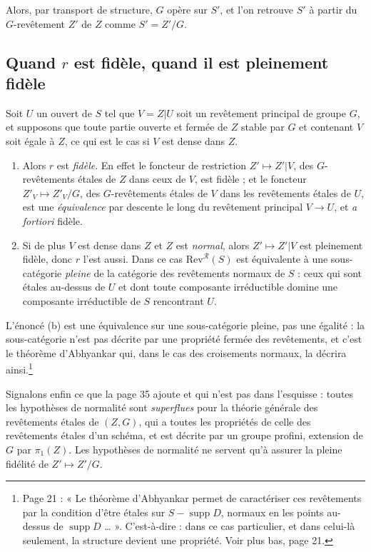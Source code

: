 \documentclass[11pt,a4paper]{article}
\begin{document}
Alors, par transport de structure, $G$ opère sur $S'$, et l'on retrouve $S'$ à
partir du $G$-revêtement $Z'$ de $Z$ comme $S' = Z'/G$.

\subsection*{Quand $r$ est fidèle, quand il est pleinement fidèle}

Soit $U$ un ouvert de $S$ tel que $V = Z|U$ soit un revêtement principal de
groupe $G$, et supposons que toute partie ouverte et fermée de $Z$ stable par
$G$ et contenant $V$ soit égale à $Z$, ce qui est le cas si $V$ est dense dans
$Z$.

\begin{enumerate}
  \item[(a)] Alors $r$ est \emph{fidèle}. En effet le foncteur de restriction
    $Z' \mapsto Z'|V$, des $G$-revêtements étales de $Z$ dans ceux de $V$, est
    fidèle ; et le foncteur $Z'_{V} \mapsto Z'_{V}/G$, des $G$-revêtements
    étales de $V$ dans les revêtements étales de $U$, est une
    \emph{équivalence} par descente le long du revêtement principal
    $V \to U$, et \emph{a fortiori} fidèle.
  \item[(b)] Si de plus $V$ est dense dans $Z$ et $Z$ est \emph{normal}, alors
    $Z' \mapsto Z'|V$ est pleinement fidèle, donc $r$ l'est aussi. Dans ce cas
    $\mathrm{Rev}^{\mathcal{R}}(S)$ est équivalente à une sous-catégorie
    \emph{pleine} de la catégorie des revêtements normaux de $S$ : ceux qui
    sont étales au-dessus de $U$ et dont toute composante irréductible domine
    une composante irréductible de $S$ rencontrant $U$.
\end{enumerate}

L'énoncé (b) est une équivalence sur une sous-catégorie pleine, pas une
égalité : la sous-catégorie n'est pas décrite par une propriété fermée des
revêtements, et c'est le théorème d'Abhyankar qui, dans le cas des
croisements normaux, la décrira ainsi.\footnote{Page 21 : « Le théorème
d'Abhyankar permet de caractériser ces revêtements par la condition d'être
étales sur $S - \operatorname{supp} D$, normaux en les points au-dessus de
$\operatorname{supp} D$ … ». C'est-à-dire : dans ce cas particulier, et
dans celui-là seulement, la structure devient une propriété. Voir plus bas,
page 21.}

Signalons enfin ce que la page 35 ajoute et qui n'est pas dans l'esquisse :
toutes les hypothèses de normalité sont \emph{superflues} pour la théorie
générale des revêtements étales de $(Z,G)$, qui a toutes les propriétés de
celle des revêtements étales d'un schéma, et est décrite par un groupe profini,
extension de $G$ par $\pi_{1}(Z)$. Les hypothèses de normalité ne servent
qu'à assurer la pleine fidélité de $Z' \mapsto Z'/G$.
\end{document}

